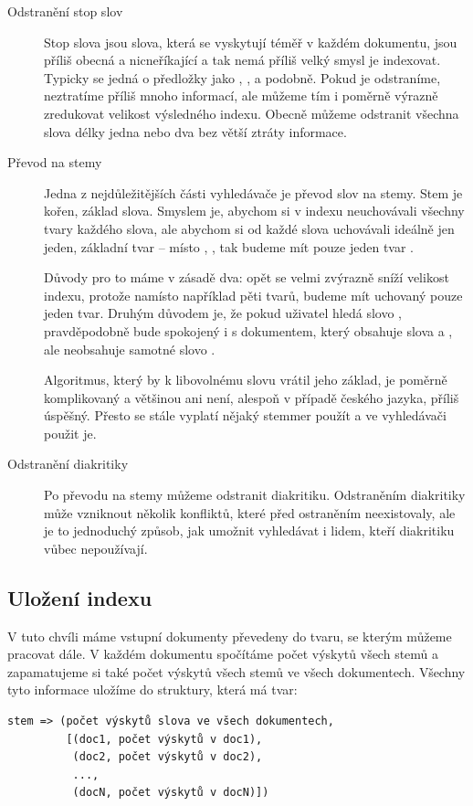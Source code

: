 \documentclass[12pt]{article}
\begin{document}
\begin{description}
\item[Odstranění stop slov] Stop slova jsou slova, která se vyskytují téměř v každém dokumentu, jsou příliš obecná a nicneříkající a tak nemá příliš velký smysl je indexovat. Typicky se jedná o předložky jako , ,  a podobně. Pokud je odstraníme, neztratíme příliš mnoho informací, ale můžeme tím i poměrně výrazně zredukovat velikost výsledného indexu. Obecně můžeme odstranit všechna slova délky jedna nebo dva bez větší ztráty informace. 

\item[Převod na stemy] Jedna z nejdůležitějších části vyhledávače je převod slov na stemy. Stem je kořen, základ slova. Smyslem je, abychom si v indexu neuchovávali všechny tvary každého slova, ale abychom si od každé slova uchovávali ideálně jen jeden, základní tvar -- místo , ,  tak budeme mít pouze jeden tvar .

Důvody pro to máme v zásadě dva: opět se velmi zvýrazně sníží velikost indexu, protože namísto například pěti tvarů, budeme mít uchovaný pouze jeden tvar. Druhým důvodem je, že pokud uživatel hledá slovo , pravděpodobně bude spokojený i s dokumentem, který obsahuje slova  a , ale neobsahuje samotné slovo . 

Algoritmus, který by k libovolnému slovu vrátil jeho základ, je poměrně komplikovaný a většinou ani není, alespoň v případě českého jazyka, příliš úspěšný. Přesto se stále vyplatí nějaký stemmer použít a ve vyhledávači použit je. 

\item[Odstranění diakritiky] Po převodu na stemy můžeme odstranit diakritiku. Odstraněním diakritiky může vzniknout několik konfliktů, které před ostraněním neexistovaly, ale je to jednoduchý způsob, jak umožnit vyhledávat i lidem, kteří diakritiku vůbec nepoužívají. 
\end{description} 


\subsection{Uložení indexu}
V tuto chvíli máme vstupní dokumenty převedeny do tvaru, se kterým můžeme pracovat dále. V každém dokumentu spočítáme počet výskytů všech stemů a zapamatujeme si také počet výskytů všech stemů ve všech dokumentech. Všechny tyto informace uložíme do struktury, která má tvar:

\begin{verbatim}
stem => (počet výskytů slova ve všech dokumentech, 
         [(doc1, počet výskytů v doc1), 
          (doc2, počet výskytů v doc2), 
          ..., 
          (docN, počet výskytů v docN)])
\end{verbatim}
\end{document}
